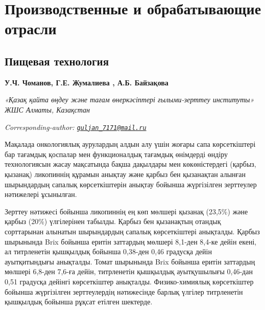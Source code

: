 \newpage
\let\cleardoublepage\clearpage
\part{Производственные и обрабатывающие отрасли}
\chapter{Пищевая технология}

\begin{articleheader}

{\bfseries У.Ч. Чоманов\authorid,
Г.Е. Жумалиева\textsuperscript{\envelope } \authorid,
А.Б. Байзақова\authorid}
\end{articleheader}

\begin{affiliation}
\emph{«Қазақ қайта өңдеу және тағам өнеркәсіптері ғылыми-зерттеу институты» ЖШС Алматы, Казақстан}

\raggedright \textsuperscript{\envelope }{\em Corresponding-author: \href{mailto:guljan_7171@mail.ru}{\nolinkurl{guljan\_7171@mail.ru}}}
\end{affiliation}

Мақалада онкологиялық аурулардың алдын алу үшін жоғары сапа
көрсеткіштері бар тағамдық қоспалар мен функционалдық тағамдық өнімдерді
өндіру технологиясын жасау мақсатында бақша дақылдары мен көкөністердегі
(қарбыз, қызанақ) ликопиннің құрамын анықтау және қарбыз бен қызанақтан
алынған шырындардың сапалық көрсеткіштерін анықтау бойынша жүргізілген
зерттеулер нәтижелері ұсынылған.

Зерттеу нәтижесі бойынша ликопиннің ең көп мөлшері қызанақ (23,5\%) және
қарбыз (20\%) үлгілерінен табылды. Қарбыз бен қызанақтың отандық
сорттарынан алынатын шырындардың сапалық көрсеткіштері анықталды. Қарбыз
шырынында Brix бойынша еритін заттардың мөлшері 8,1-ден 8,4-ке дейін
екені, ал титрленетін қышқылдық бойынша 0,38-ден 0,46 градусқа дейін
ауытқитындығы анықталды. Томат шырынында Brix бойынша еритін заттардың
мөлшері 6,8-ден 7,6-ға дейін, титрленетін қышқылдық ауытқушылығы
0,46-дан 0,51 градусқа дейінгі көрсеткіштер анықталды. Физико-химиялық
көрсеткіштер бойынша жүргізілген зерттеулердің нәтижесінде барлық
үлгілер титрленетін қышқылдық бойынша рұқсат етілген шектерде.

